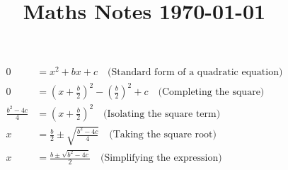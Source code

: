 \documentclass{article}
\title{Maths Notes \today}
\begin{document}
\maketitle
\begin{align}
0 & = x^2 + bx + c \quad \text{(Standard form of a quadratic equation)} \\
0 & = \left( x + \frac{b}{2} \right)^2 - \left( \frac{b}{2} \right)^2 + c \quad \text{(Completing the square)} \\
\frac{b^2 - 4c}{4} & = \left( x + \frac{b}{2} \right)^2 \quad \text{(Isolating the square term)} \\
x & = \frac{b}{2} \pm \sqrt{\frac{b^2 - 4c}{4}} \quad \text{(Taking the square root)} \\
x & = \frac{b \pm \sqrt{b^2 - 4c}}{2} \quad \text{(Simplifying the expression)}
\end{align}
\end{document}
